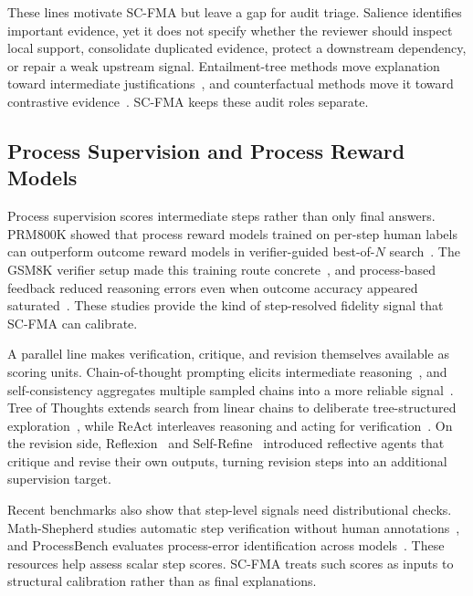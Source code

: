 \documentclass[a4paper,fleqn]{cas-sc}
\begin{document}
These lines motivate SC-FMA but leave a gap for audit triage. Salience identifies important evidence, yet it does not specify whether the reviewer should inspect local support, consolidate duplicated evidence, protect a downstream dependency, or repair a weak upstream signal. Entailment-tree methods move explanation toward intermediate justifications~\cite{dalvi2021entailmenttrees}, and counterfactual methods move it toward contrastive evidence~\cite{wijekoon2023counterfactual}. SC-FMA keeps these audit roles separate.

\subsection{Process Supervision and Process Reward Models}

Process supervision scores intermediate steps rather than only final answers. PRM800K showed that process reward models trained on per-step human labels can outperform outcome reward models in verifier-guided best-of-$N$ search~\cite{lightman2023verify}. The GSM8K verifier setup made this training route concrete~\cite{cobbe2021training}, and process-based feedback reduced reasoning errors even when outcome accuracy appeared saturated~\cite{uesato2022solving}. These studies provide the kind of step-resolved fidelity signal that SC-FMA can calibrate.

A parallel line makes verification, critique, and revision themselves available as scoring units. Chain-of-thought prompting elicits intermediate reasoning~\cite{wei2022cot}, and self-consistency aggregates multiple sampled chains into a more reliable signal~\cite{wang2022selfconsistency}. Tree of Thoughts extends search from linear chains to deliberate tree-structured exploration~\cite{yao2023tot}, while ReAct interleaves reasoning and acting for verification~\cite{yao2022react}. On the revision side, Reflexion~\cite{shinn2023reflexion} and Self-Refine~\cite{madaan2023selfrefine} introduced reflective agents that critique and revise their own outputs, turning revision steps into an additional supervision target.

Recent benchmarks also show that step-level signals need distributional checks. Math-Shepherd studies automatic step verification without human annotations~\cite{wang2024mathshepherd}, and ProcessBench evaluates process-error identification across models~\cite{zheng2024processbench}. These resources help assess scalar step scores. SC-FMA treats such scores as inputs to structural calibration rather than as final explanations.
\end{document}
